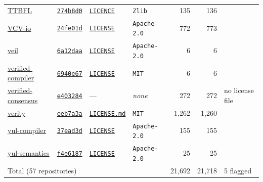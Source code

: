 \documentclass{article}
\begin{document}
\begin{table}[p]
\begin{tabular}{lllp{2.9cm}rrl}
    \href{https://github.com/ionathanch/TTBFL}{TTBFL} & \href{https://github.com/ionathanch/TTBFL/tree/274b8d0410b7c1671f15f140e75634065bb06bf9}{\texttt{274b8d0}} & \href{https://github.com/ionathanch/TTBFL/blob/274b8d0410b7c1671f15f140e75634065bb06bf9/LICENCE}{\texttt{LICENCE}} & \texttt{Zlib} & 135 & 136 &  \\
    \href{https://github.com/Verified-zkEVM/VCV-io}{VCV-io} & \href{https://github.com/Verified-zkEVM/VCV-io/tree/24fe01dbaf899b7bb2b19453ae2ada61b49b4255}{\texttt{24fe01d}} & \href{https://github.com/Verified-zkEVM/VCV-io/blob/24fe01dbaf899b7bb2b19453ae2ada61b49b4255/LICENSE}{\texttt{LICENSE}} & \texttt{Apache-2.0} & 772 & 773 &  \\
    \href{https://github.com/verse-lab/veil}{veil} & \href{https://github.com/verse-lab/veil/tree/6a12daa8d3e0e8a9808a40ecab17ca030b557063}{\texttt{6a12daa}} & \href{https://github.com/verse-lab/veil/blob/6a12daa8d3e0e8a9808a40ecab17ca030b557063/LICENSE}{\texttt{LICENSE}} & \texttt{Apache-2.0} & 6 & 6 &  \\
    \href{https://github.com/marcusrossel/verified-compiler}{verified-compiler} & \href{https://github.com/marcusrossel/verified-compiler/tree/6940e67e5ec2d846310a927c2211d2b94f69162c}{\texttt{6940e67}} & \href{https://github.com/marcusrossel/verified-compiler/blob/6940e67e5ec2d846310a927c2211d2b94f69162c/LICENSE}{\texttt{LICENSE}} & \texttt{MIT} & 6 & 6 &  \\
    \href{https://github.com/fradamt/verified-consensus}{verified-consensus} & \href{https://github.com/fradamt/verified-consensus/tree/e403284a81a272924891b88471e28acc47b556f0}{\texttt{e403284}} & --- & \emph{none} & 272 & 272 & no license file \\
    \href{https://github.com/lfglabs-dev/verity}{verity} & \href{https://github.com/lfglabs-dev/verity/tree/eeb7a3abe85dd88cc8ee2ece5a77da9b2aba2978}{\texttt{eeb7a3a}} & \href{https://github.com/lfglabs-dev/verity/blob/eeb7a3abe85dd88cc8ee2ece5a77da9b2aba2978/LICENSE.md}{\texttt{LICENSE.md}} & \texttt{MIT} & 1{,}262 & 1{,}260 &  \\
    \href{https://github.com/powdr-labs/yul-compiler}{yul-compiler} & \href{https://github.com/powdr-labs/yul-compiler/tree/37ead3d1abddd98ef5c69ef434de8bbe6bb868af}{\texttt{37ead3d}} & \href{https://github.com/powdr-labs/yul-compiler/blob/37ead3d1abddd98ef5c69ef434de8bbe6bb868af/LICENSE}{\texttt{LICENSE}} & \texttt{Apache-2.0} & 155 & 155 &  \\
    \href{https://github.com/powdr-labs/yul-semantics}{yul-semantics} & \href{https://github.com/powdr-labs/yul-semantics/tree/f4e6187d684c0ebaee751750c5c368a4226abb73}{\texttt{f4e6187}} & \href{https://github.com/powdr-labs/yul-semantics/blob/f4e6187d684c0ebaee751750c5c368a4226abb73/LICENSE}{\texttt{LICENSE}} & \texttt{Apache-2.0} & 25 & 25 &  \\
    \midrule
    \multicolumn{4}{l}{Total (57 repositories)} & 21{,}692 & 21{,}718 & 5 flagged \\
    \bottomrule
  \end{tabular}
\end{table}
\end{document}
